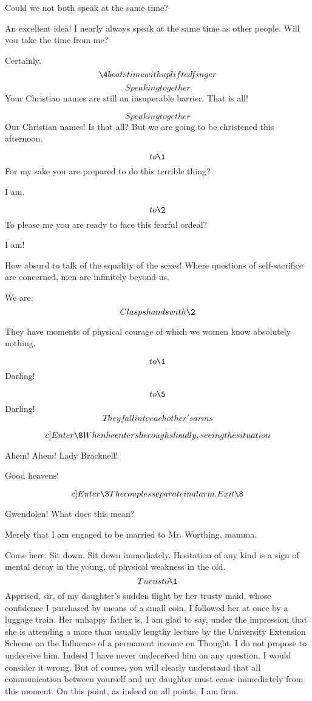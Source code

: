 \documentclass{book}
\begin{document}
\5  Could we not both speak at the same time?

\4  An excellent idea!  I nearly always speak at the same
time as other people.  Will you take the time from me?

\5  Certainly.  \[\4 beats time with uplifted finger\]
 \[Speaking together\]  Your Christian names are
still an insuperable barrier.  That is all!

\[Speaking together\]  Our Christian names!  Is
that all?  But we are going to be christened this afternoon.

\4  \[to \1\]  For my sake you are prepared to do this
terrible thing?

\1  I am.

\5  \[to \2\]  To please me you are ready to face this
fearful ordeal?

\2  I am!

\4  How absurd to talk of the equality of the sexes!  Where
questions of self-sacrifice are concerned, men are infinitely
beyond us.

\1  We are.  \[Clasps hands with \2\]

\5  They have moments of physical courage of which we women
know absolutely nothing.

\4  \[to \1\]  Darling!

\2  \[to \5\]  Darling!  \[They fall into each other's
arms\]

\[c]Enter \8  When he enters he coughs loudly,\\ seeing the
situation\]

\8  Ahem!  Ahem!  Lady Bracknell!

\1  Good heavens!

\[c]Enter \3  The couples separate in alarm.\\ Exit \8\]

\3  Gwendolen!  What does this mean?

\4  Merely that I am engaged to be married to Mr. Worthing,
mamma.

\3  Come here.  Sit down.  Sit down immediately.
Hesitation of any kind is a sign of mental decay in the young, of
physical weakness in the old.  \[Turns to \1\]  Apprised, sir, of
my daughter's sudden flight by her trusty maid, whose confidence I
purchased by means of a small coin, I followed her at once by a
luggage train.  Her unhappy father is, I am glad to say, under the
impression that she is attending a more than usually lengthy
lecture by the University Extension Scheme on the Influence of a
permanent income on Thought.  I do not propose to undeceive him.
Indeed I have never undeceived him on any question.  I would
consider it wrong.  But of course, you will clearly understand that
all communication between yourself and my daughter must cease
immediately from this moment.  On this point, as indeed on all
points, I am firm.
\end{document}
